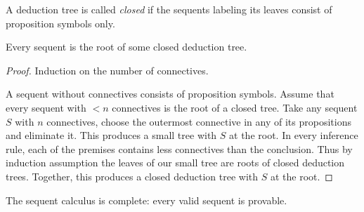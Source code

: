 \begin{page}
\setcounter{section}{2}
\setcounter{subsection}{7}
\setcounter{dfn}{17}
\label{portion:471}

\begin{dfn}
A deduction tree is called \emph{closed} if the sequents labeling its leaves consist of proposition symbols only.
\end{dfn}

\end{page}

\begin{page}
\setcounter{section}{2}
\setcounter{subsection}{7}
\setcounter{dfn}{18}
\label{portion:474}

\begin{lem}
Every sequent is the root of some closed deduction tree.
\end{lem}

\end{page}

\begin{page}
\setcounter{section}{2}
\setcounter{subsection}{7}
\setcounter{dfn}{18}
\label{portion:475}

\begin{proof}
Induction on the number of connectives.

A sequent without connectives consists of proposition symbols.
Assume that every sequent with $< n$ connectives is the root of a closed tree.
Take any sequent $S$ with $n$ connectives, choose the outermost connective in any of its propositions and eliminate it.
This produces a small tree with $S$ at the root.
In every inference rule, each of the premises contains less connectives than the conclusion.
Thus by induction assumption the leaves of our small tree are roots of closed deduction trees.
Together, this produces a closed deduction tree with $S$ at the root.
\end{proof}


\end{page}

\begin{page}
\setcounter{section}{2}
\setcounter{subsection}{7}
\setcounter{dfn}{19}
\label{portion:477}

\begin{thm}
The sequent calculus is complete: every valid sequent is provable.
\end{thm}

\end{page}

